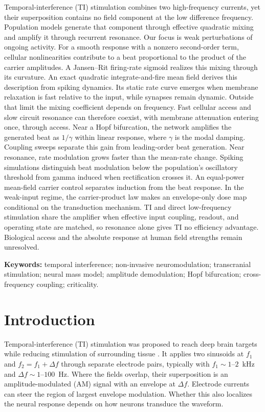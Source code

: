 \documentclass[11pt,a4paper]{article}
\begin{document}
\else
\noindent
Temporal-interference (TI) stimulation combines two high-frequency currents, yet their
superposition contains no field component at the low difference frequency. Population
models generate that component through effective quadratic mixing and amplify it through
recurrent resonance. Our focus is weak perturbations of ongoing activity. For a smooth
response with a nonzero second-order term,
cellular nonlinearities contribute to a beat proportional to the product of the carrier
amplitudes. A Jansen--Rit firing-rate sigmoid realizes this mixing through its curvature.
An exact quadratic integrate-and-fire mean field derives this description from spiking
dynamics. Its static rate curve emerges when membrane relaxation is fast relative to the
input, while synapses remain dynamic. Outside that limit the mixing coefficient depends
on frequency. Fast cellular access and slow circuit resonance can therefore coexist, with
membrane attenuation entering once, through access. Near a Hopf bifurcation, the network amplifies the
generated beat as $1/\gamma$ within linear response, where $\gamma$ is the modal damping.
Coupling sweeps separate this gain from leading-order beat generation. Near resonance,
rate modulation grows faster than the mean-rate change. Spiking simulations distinguish
beat modulation below the population's oscillatory threshold from gamma induced when
rectification crosses it. An equal-power mean-field carrier control separates induction from the
beat response. In the weak-input regime, the carrier-product
law makes an envelope-only dose map conditional on the transduction mechanism. TI and
direct low-frequency stimulation share the amplifier when effective input coupling,
readout, and operating state are matched, so resonance alone gives TI no efficiency
advantage. Biological access and the absolute response at human field strengths remain
unresolved.
\fi

\smallskip
\noindent\textbf{Keywords:} temporal interference; non-invasive neuromodulation;
transcranial stimulation; neural mass model; amplitude demodulation; Hopf bifurcation;
cross-frequency coupling; criticality.

\clearpage
\tableofcontents
\clearpage

\section{Introduction}
Temporal-interference (TI) stimulation was proposed to reach deep brain targets while
reducing stimulation of surrounding tissue \cite{grossman2017}. It applies two sinusoids at
$f_1$ and $f_2=f_1+\Delta f$ through separate electrode pairs, typically with
$f_1\sim1$--$2$~kHz and $\Delta f\sim1$--$100$~Hz. Where the fields overlap, their
superposition is an amplitude-modulated (AM) signal with an envelope at $\Delta f$.
Electrode currents can steer the region of largest envelope modulation. Whether this
also localizes the neural response depends on how neurons transduce the waveform.
\end{document}
